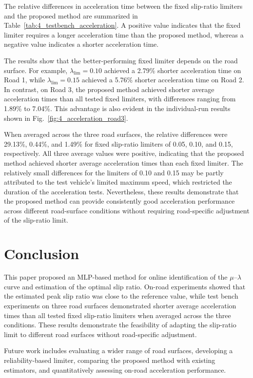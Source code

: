 \documentclass[dvipdfmx,conference]{IEEEtran}
\begin{document}
The relative differences in acceleration time between the fixed slip-ratio limiters and the proposed method are summarized in Table~\ref{tab:4_testbench_acceleration}. A positive value indicates that the fixed limiter requires a longer acceleration time than the proposed method, whereas a negative value indicates a shorter acceleration time.

The results show that the better-performing fixed limiter depends on the road surface. For example, $\lambda_\mathrm{lim}=0.10$ achieved a 2.79\% shorter acceleration time on Road 1, while $\lambda_\mathrm{lim}=0.15$ achieved a 5.76\% shorter acceleration time on Road 2. In contrast, on Road 3, the proposed method achieved shorter average acceleration times than all tested fixed limiters, with differences ranging from 1.89\% to 7.04\%. This advantage is also evident in the individual-run results shown in Fig.~\ref{fig:4_acceleration_road3}.

When averaged across the three road surfaces, the relative differences were 29.13\%, 0.44\%, and 1.49\% for fixed slip-ratio limiters of 0.05, 0.10, and 0.15, respectively. All three average values were positive, indicating that the proposed method achieved shorter average acceleration times than each fixed limiter. The relatively small differences for the limiters of 0.10 and 0.15 may be partly attributed to the test vehicle's limited maximum speed, which restricted the duration of the acceleration tests. Nevertheless, these results demonstrate that the proposed method can provide consistently good acceleration performance across different road-surface conditions without requiring road-specific adjustment of the slip-ratio limit.

\section{Conclusion}
This paper proposed an MLP-based method for online identification of the $\mu$--$\lambda$ curve and estimation of the optimal slip ratio.
On-road experiments showed that the estimated peak slip ratio was close to the reference value, while test bench experiments on three road surfaces demonstrated shorter average acceleration times than all tested fixed slip-ratio limiters when averaged across the three conditions.
These results demonstrate the feasibility of adapting the slip-ratio limit to different road surfaces without road-specific adjustment.

Future work includes evaluating a wider range of road surfaces, developing a reliability-based limiter, comparing the proposed method with existing estimators, and quantitatively assessing on-road acceleration performance.
\end{document}
